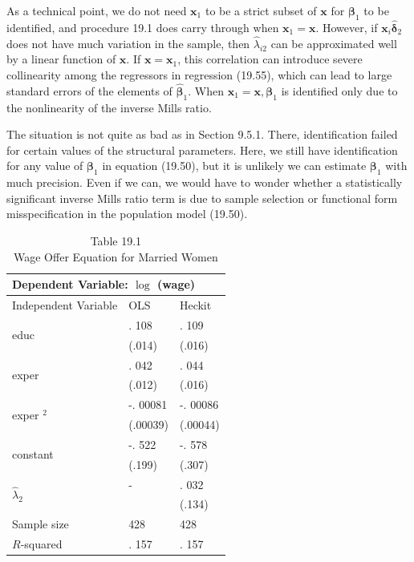 \documentclass[10pt]{article}
\begin{document}
As a technical point, we do not need $\mathbf{x}_{1}$ to be a strict subset of $\mathbf{x}$ for $\boldsymbol{\beta}_{1}$ to be identified, and procedure 19.1 does carry through when $\mathbf{x}_{1}=\mathbf{x}$. However, if $\mathbf{x}_{i} \hat{\boldsymbol{\delta}}_{2}$ does not have much variation in the sample, then $\hat{\lambda}_{i 2}$ can be approximated well by a linear function of $\mathbf{x}$. If $\mathbf{x}=\mathbf{x}_{1}$, this correlation can introduce severe collinearity among the regressors in regression (19.55), which can lead to large standard errors of the elements of $\hat{\boldsymbol{\beta}}_{1}$. When $\mathbf{x}_{1}=\mathbf{x}, \boldsymbol{\beta}_{1}$ is identified only due to the nonlinearity of the inverse Mills ratio.

The situation is not quite as bad as in Section 9.5.1. There, identification failed for certain values of the structural parameters. Here, we still have identification for any value of $\boldsymbol{\beta}_{1}$ in equation (19.50), but it is unlikely we can estimate $\boldsymbol{\beta}_{1}$ with much precision. Even if we can, we would have to wonder whether a statistically significant inverse Mills ratio term is due to sample selection or functional form misspecification in the population model (19.50).

\begin{table}[h]
\begin{center}
\captionsetup{labelformat=empty}
\caption{Table 19.1\\
Wage Offer Equation for Married Women}
\begin{tabular}{|l|l|l|}
\hline
\multicolumn{3}{|l|}{Dependent Variable: $\log$ (wage)} \\
\hline
Independent Variable & OLS & Heckit \\
\hline
\multirow[t]{2}{*}{educ} & . 108 & . 109 \\
\hline
 & (.014) & (.016) \\
\hline
\multirow[t]{2}{*}{exper} & . 042 & . 044 \\
\hline
 & (.012) & (.016) \\
\hline
\multirow[t]{2}{*}{exper ${ }^{2}$} & -. 00081 & -. 00086 \\
\hline
 & (.00039) & (.00044) \\
\hline
\multirow[t]{2}{*}{constant} & -. 522 & -. 578 \\
\hline
 & (.199) & (.307) \\
\hline
\multirow[t]{2}{*}{$\hat{\lambda}_{2}$} & - & . 032 \\
\hline
 &  & (.134) \\
\hline
Sample size & 428 & 428 \\
\hline
$R$-squared & . 157 & . 157 \\
\hline
\end{tabular}
\end{center}
\end{table}
\end{document}
